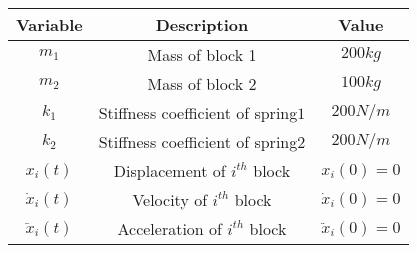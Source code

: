     \begin{tabular}{|c|c|c|} 
    \hline
\textbf{Variable} & \textbf{Description} & \textbf{Value} \\\hline
    $m_1$ & Mass of block 1 & $200kg$  \\\hline
    $m_2$ & Mass of block 2 & $100kg$  \\\hline
    $k_1$ & Stiffness coefficient of spring$1$ & $200N/m$  \\\hline
    $k_2$ & Stiffness coefficient of spring$2$ & $200N/m$  \\\hline
    $x_i(t)$ & Displacement of $i^{th}$ block & $x_i(0)=0$ \\ \hline
    $\dot x_i(t)$ & Velocity of $i^{th}$ block & $\dot x_i(0)=0$ \\ \hline
    $\ddot x_i(t)$ & Acceleration of $i^{th}$ block & $\ddot x_i(0)=0$ \\ \hline
    \end{tabular}
    
    
